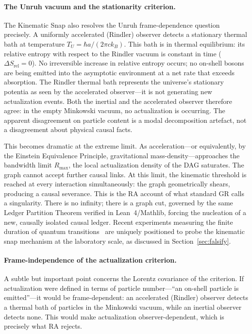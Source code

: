 \documentclass[11pt,a4paper]{article}
\theoremstyle{plain}
\theoremstyle{definition}
\theoremstyle{remark}
\begin{document}
\paragraph{The Unruh vacuum and the stationarity criterion.}
The Kinematic Snap also resolves the Unruh frame-dependence question precisely.
A uniformly accelerated (Rindler) observer detects a stationary thermal bath at
temperature $T_U = \hbar a / (2\pi c k_B)$. This bath is in thermal equilibrium:
its relative entropy with respect to the Rindler vacuum is constant in time
($\Delta S_{\mathrm{rel}} = 0$). No irreversible increase in relative entropy
occurs; no on-shell bosons are being emitted into the asymptotic environment at
a net rate that exceeds absorption. The Rindler thermal bath represents the
universe's stationary potentia as seen by the accelerated observer---it is not
generating new actualization events. Both the inertial and the accelerated
observer therefore agree: in the empty Minkowski vacuum, no actualization is
occurring. The apparent disagreement on particle content is a modal decomposition
artefact, not a disagreement about physical causal facts.

This becomes dramatic at the extreme limit. As acceleration---or equivalently,
by the Einstein Equivalence Principle, gravitational mass-density---approaches
the bandwidth limit $R_{\mathrm{max}}$, the local actualization density of the
DAG saturates. The graph cannot accept further causal links. At this limit, the
kinematic threshold is reached at every interaction simultaneously: the graph
geometrically shears, producing a causal severance. This is the RA account of
what standard GR calls a singularity. There is no infinity; there is a graph cut,
governed by the same Ledger Partition Theorem verified in Lean~4/Mathlib, forcing
the nucleation of a new, causally isolated causal ledger. Recent experiments
measuring the finite duration of quantum transitions~\citep{Minev2019} are
uniquely positioned to probe the kinematic snap mechanism at the laboratory scale,
as discussed in Section~\ref{sec:falsify}.

\paragraph{Frame-independence of the actualization criterion.}
A subtle but important point concerns the Lorentz covariance of the criterion.
If actualization were defined in terms of particle number---``an on-shell particle
is emitted''---it would be frame-dependent: an accelerated (Rindler) observer
detects a thermal bath of particles in the Minkowski vacuum, while an inertial
observer detects none. This would make actualization observer-dependent, which
is precisely what RA rejects.
\end{document}
